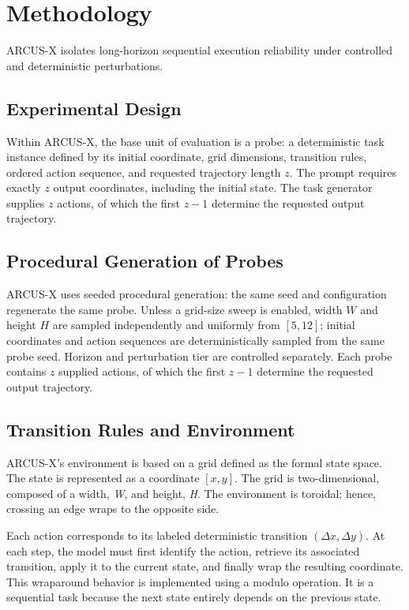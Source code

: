 \documentclass{article}
\begin{document}
\section{Methodology}

\label{Methodology}

ARCUS-X isolates long-horizon sequential execution reliability under controlled and deterministic perturbations.

\subsection{Experimental Design}

Within ARCUS-X, the base unit of evaluation is a probe:
a deterministic task instance defined by its initial
coordinate, grid dimensions, transition rules, ordered
action sequence, and requested trajectory length $z$.
The prompt requires exactly $z$ output coordinates,
including the initial state. The task generator supplies
$z$ actions, of which the first $z-1$ determine the
requested output trajectory.
\subsection{Procedural Generation of Probes}

ARCUS-X uses seeded procedural generation: the same seed and configuration regenerate the same probe. Unless a grid-size sweep is enabled, width $W$ and height $H$ are sampled independently and uniformly from $[5,12]$; initial coordinates and action sequences are deterministically sampled from the same probe seed. Horizon and perturbation tier are controlled separately. Each probe contains $z$ supplied actions, of which the first $z-1$ determine the requested output trajectory.

\subsection{Transition Rules and Environment}

ARCUS-X's environment is based on a grid defined as the formal state space. The state is represented as a coordinate $[x,y]$. The grid is two-dimensional, composed of a width, \textit{W}, and height, \textit{H}. The environment is toroidal; hence, crossing an edge wraps to the opposite side.

Each action corresponds to its labeled deterministic transition $(\Delta x, \Delta y)$. At each step, the model must first identify the action, retrieve its associated transition, apply it to the current state, and finally wrap the resulting coordinate. This wraparound behavior is implemented using a modulo operation. It is a sequential task because the next state entirely depends on the previous state.
\end{document}

